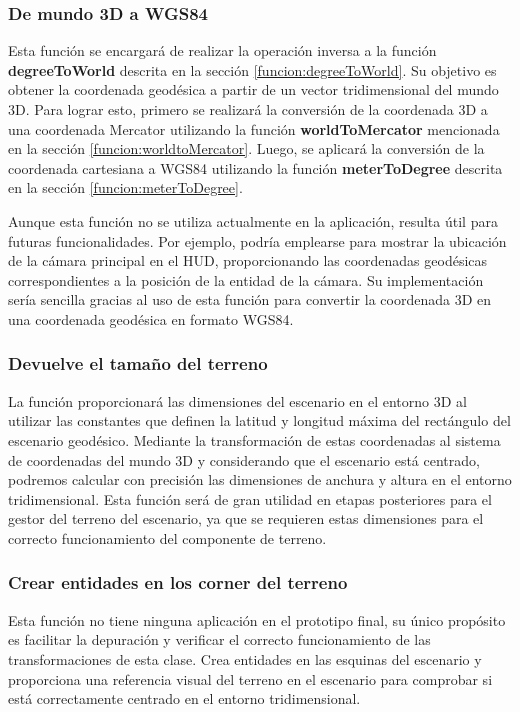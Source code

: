 \documentclass[a4paper, 11pt]{book}
\begin{document}
\subsubsection{De mundo 3D a WGS84}
\label{funcion:worldToDegree}
Esta función se encargará de realizar la operación inversa a la función \textbf{degreeToWorld} descrita en la sección \ref{funcion:degreeToWorld}. Su objetivo es obtener la coordenada geodésica a partir de un vector tridimensional del mundo 3D. Para lograr esto, primero se realizará la conversión de la coordenada 3D a una coordenada Mercator utilizando la función \textbf{worldToMercator} mencionada en la sección \ref{funcion:worldtoMercator}. Luego, se aplicará la conversión de la coordenada cartesiana a WGS84 utilizando la función \textbf{meterToDegree} descrita en la sección \ref{funcion:meterToDegree}.

Aunque esta función no se utiliza actualmente en la aplicación, resulta útil para futuras funcionalidades. Por ejemplo, podría emplearse para mostrar la ubicación de la cámara principal en el HUD, proporcionando las coordenadas geodésicas correspondientes a la posición de la entidad de la cámara. Su implementación sería sencilla gracias al uso de esta función para convertir la coordenada 3D en una coordenada geodésica en formato WGS84.

\subsubsection{Devuelve el tamaño del terreno}
\label{funcion:getGroundSize}
La función proporcionará las dimensiones del escenario en el entorno 3D al utilizar las constantes que definen la latitud y longitud máxima del rectángulo del escenario geodésico. Mediante la transformación de estas coordenadas al sistema de coordenadas del mundo 3D y considerando que el escenario está centrado, podremos calcular con precisión las dimensiones de anchura y altura en el entorno tridimensional. Esta función será de gran utilidad en etapas posteriores para el gestor del terreno del escenario, ya que se requieren estas dimensiones para el correcto funcionamiento del componente de terreno.

\subsubsection{Crear entidades en los corner del terreno}
\label{funcion:createCorner}
Esta función no tiene ninguna aplicación en el prototipo final, su único propósito es facilitar la depuración y verificar el correcto funcionamiento de las transformaciones de esta clase. Crea entidades en las esquinas del escenario y proporciona una referencia visual del terreno en el escenario para comprobar si está correctamente centrado en el entorno tridimensional.
\clearpage
\end{document}

